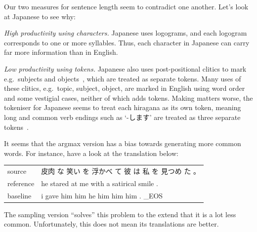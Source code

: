\documentclass[answers]{exam}
\begin{document}
\begin{CJK}{UTF8}{min}
\begin{questions}
\begin{framed}
  Our two measures for sentence length seem to contradict one another. Let's
  look at Japanese to see why:
  \begin{compactitem}
  \item {\it High productivity using characters.}
    Japanese uses logograms, and each logogram corresponds to one or more
    syllables. Thus, each character in Japanese can carry far more information
    than in English.
  \item {\it Low productivity using tokens.}
    Japanese also uses post-positional clitics to mark e.g.\ subjects and
    objects~\citep{Hinds-1986}, which are treated as separate tokens.
    Many uses of these clitics, e.g.\ topic, subject, object, are marked in
    English using word order and some vestigial cases, neither of which adds
    tokens.
    Making matters worse, the tokeniser for Japanese seems to treat each
    hiragana as its own token, meaning long and common verb endings such as
    `-します' are treated as three separate
    tokens~\citep{Minna-1998}.
  \end{compactitem}
\end{framed}


\begin{framed}
\begin{compactenum}[1.]
\item
  It seems that the argmax version has a bias towards generating more common
  words. For instance, have a look at the translation below:
  
  \begin{tabular}{ll}
    source    & 皮肉 な 笑い を 浮かべ て 彼 は 私 を 見つめ た 。\\
    reference & he stared at me with a satirical smile .\\
    baseline  & i gave him him he him him him . \_EOS\\
  \end{tabular}

  The sampling version ``solves'' this problem to the extend that it is a lot
  less common. Unfortunately, this does not mean its translations are better. 


\end{compactenum}
\end{framed}
\end{questions}
\end{CJK}
\end{document}
